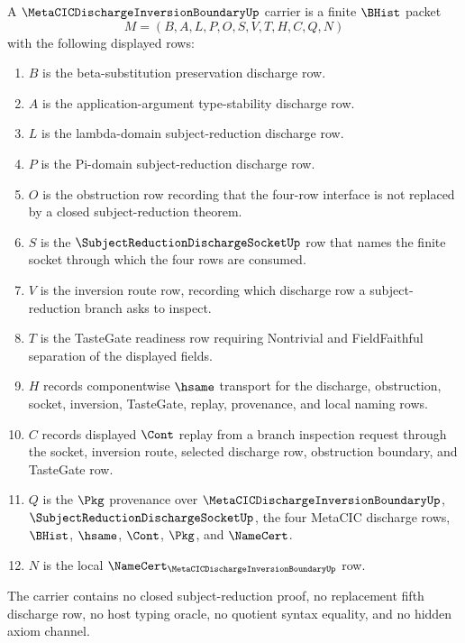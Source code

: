 \begin{definition}
\label{def:metacic-discharge-inversion-boundary-carrier}
A $\MetaCICDischargeInversionBoundaryUp$ carrier is a finite $\BHist$ packet
$$
M=(B,A,L,P,O,S,V,T,H,C,Q,N)
$$
with the following displayed rows:
\begin{enumerate}
\item $B$ is the beta-substitution preservation discharge row.
\item $A$ is the application-argument type-stability discharge row.
\item $L$ is the lambda-domain subject-reduction discharge row.
\item $P$ is the Pi-domain subject-reduction discharge row.
\item $O$ is the obstruction row recording that the four-row interface is not replaced by a closed subject-reduction theorem.
\item $S$ is the $\SubjectReductionDischargeSocketUp$ row that names the finite socket through which the four rows are consumed.
\item $V$ is the inversion route row, recording which discharge row a subject-reduction branch asks to inspect.
\item $T$ is the TasteGate readiness row requiring Nontrivial and FieldFaithful separation of the displayed fields.
\item $H$ records componentwise $\hsame$ transport for the discharge, obstruction, socket, inversion, TasteGate, replay, provenance, and local naming rows.
\item $C$ records displayed $\Cont$ replay from a branch inspection request through the socket, inversion route, selected discharge row, obstruction boundary, and TasteGate row.
\item $Q$ is the $\Pkg$ provenance over $\MetaCICDischargeInversionBoundaryUp$, $\SubjectReductionDischargeSocketUp$, the four MetaCIC discharge rows, $\BHist$, $\hsame$, $\Cont$, $\Pkg$, and $\NameCert$.
\item $N$ is the local $\NameCert_{\MetaCICDischargeInversionBoundaryUp}$ row.
\end{enumerate}
The carrier contains no closed subject-reduction proof, no replacement fifth discharge row, no host typing oracle, no quotient syntax equality, and no hidden axiom channel.
\end{definition}

